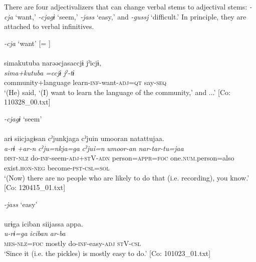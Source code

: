 There are four adjectivalizers that can change verbal stems to adjectival stems: \textit{-cja} ‘want,’ \textit{-cjagɨ} ‘seem,’ \textit{-jass} ‘easy,’ and \textit{-gussj} ‘difficult.’ In principle, they are attached to verbal infinitives.

\ea \label{ex:4.59} \ea  \textit{-cja} ‘want’ [= ] \label{ex:4.59a}\\\\
  \glll    simakutuba   narəəcjasaccjɨ  jˀicjɨ,\\
      \textit{sima+kutuba}  \textit{=ccjɨ}  \textit{jˀ-tɨ}\\
      community+language  learn-\textsc{inf}-want-\textsc{adj}=\textsc{qt}  say-\textsc{seq}\\
      \glt       ‘(He) said, ‘(I) want to learn the language of the community,’ and ...’ [Co: 110328\_00.txt]

\ex  \textit{-cjagɨ} ‘seem’\\\\
     \glll arɨ  siicjagɨsan  cˀjunkjaga    cˀjuin  umooran  natattujaa.\\
      \textit{a-rɨ}  \textit{+ar-n}  \textit{cˀju=nkja=ga}   \textit{cˀjui=n}  \textit{umoor-an}  \textit{nar-tar-tu=jaa}\\                                                                          
      \textsc{dist}-\textsc{nlz}  do-\textsc{inf}-seem-\textsc{adj}+\textsc{st}V-\textsc{adn}  person=\textsc{appr}=\textsc{foc}                   one.\textsc{num}.person=also  exist.\textsc{hon}-\textsc{neg}  become-\textsc{pst}-\textsc{csl}=\textsc{sol}\\
     \glt  ‘(Now) there are no people who are likely to do that (i.e. recording), you know.’   [Co: 120415\_01.txt]

\ex \textit{-jass} ‘easy’\\\\
    \glll     urɨga  {\textbar}iciban{\textbar}  siijassa  appa.\\
      \textit{u-rɨ=ga}  \textit{iciban}  \textit{}  \textit{ar-ba}\\
      \textsc{mes}-\textsc{nlz}=\textsc{foc}  mostly  do-\textsc{inf}-easy-\textsc{adj}  \textsc{st}V-\textsc{csl}\\
      \glt       ‘Since it (i.e. the pickles) is mostly easy to do.’ [Co: 101023\_01.txt]

